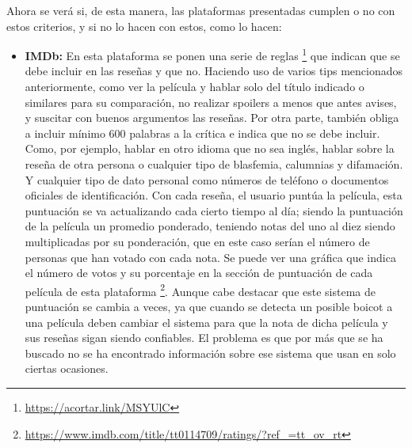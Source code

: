 Ahora se verá si, de esta manera, las plataformas presentadas cumplen o no con estos criterios, y si no lo hacen con estos, como lo hacen:

\begin{itemize}
\item \textbf{IMDb:} En esta plataforma se ponen una serie de reglas \footnote{\url{https://acortar.link/MSYUlC}} que indican que se debe incluir en las reseñas y que no. Haciendo uso de varios tips mencionados anteriormente, como ver la película y hablar solo del título indicado o similares para su comparación, no realizar spoilers a menos que antes avises, y suscitar con buenos argumentos las reseñas. Por otra parte, también obliga a incluir mínimo 600 palabras a la crítica e indica que no se debe incluir. Como, por ejemplo, hablar en otro idioma que no sea inglés, hablar sobre la reseña de otra persona o cualquier tipo de blasfemia, calumnias y difamación. Y cualquier tipo de dato personal como números de teléfono o documentos oficiales de identificación. Con cada reseña, el usuario puntúa la película, esta puntuación se va actualizando cada cierto tiempo al día; siendo la puntuación de la película un promedio ponderado, teniendo notas del uno al diez siendo multiplicadas por su ponderación, que en este caso serían el número de personas que han votado con cada nota. Se puede ver una gráfica que indica el número de votos y su porcentaje en la sección de puntuación de cada película de esta plataforma \footnote{\url{https://www.imdb.com/title/tt0114709/ratings/?ref_=tt_ov_rt}}. Aunque cabe destacar que este sistema de puntuación se cambia a veces, ya que cuando se detecta un posible boicot a una película deben cambiar el sistema para que la nota de dicha película y sus reseñas sigan siendo confiables. El problema es que por más que se ha buscado no se ha encontrado información sobre ese sistema que usan en solo ciertas ocasiones.

\end{itemize}
